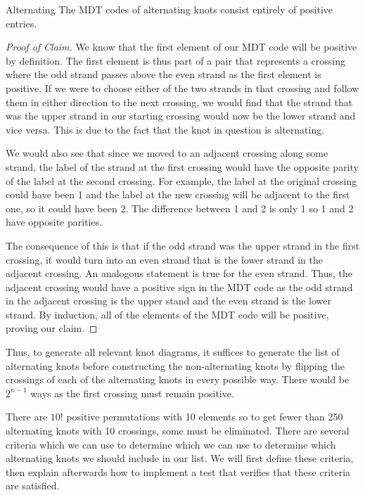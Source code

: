 \begin{paper}
\begin{paperclm}{Alternating}
{The MDT codes of alternating knots consist entirely of positive entries.}
\end{paperclm}
\begin{proof}[Proof of Claim]
We know that the first element of our MDT code will be positive by definition.
The first element is thus part of a pair that represents a crossing where the
odd strand passes above the even strand as the first element is positive.
If we were to choose either of the two strands in that crossing and follow them
in either direction to the next crossing, we would find that the strand that
was the upper strand in our starting crossing would now be the lower strand and
vice versa.
This is due to the fact that the knot in question is alternating.

We would also see that since we moved to an adjacent crossing along some strand,
the label of the strand at the first crossing would have the opposite parity of
the label at the second crossing.
For example, the label at the original crossing could have been 1 and the label
at the new crossing will be adjacent to the first one, so it could have been 2.
The difference between 1 and 2 is only 1 so 1 and 2 have opposite parities.

The consequence of this is that if the odd strand was the upper strand in the
first crossing, it would turn into an even strand that is the lower strand in
the adjacent crossing.
An analogous statement is true for the even strand.
Thus, the adjacent crossing would have a positive sign in the MDT code as the
odd strand in the adjacent crossing is the upper stand and the even strand is
the lower strand.
By induction, all of the elements of the MDT code will be positive, proving our
claim.
\end{proof}

Thus, to generate all relevant knot diagrams, it suffices to generate the list
of alternating knots before constructing the non-alternating knots by flipping
the crossings of each of the alternating knots in every possible way.
There would be $2^{n-1}$ ways as the first crossing must remain positive.

There are $10!$ positive permutations with 10 elements so to get fewer than 250
alternating knots with 10 crossings, some must be eliminated.
There are several criteria which we can use to determine which we can use to
determine which alternating knots we should include in our list.
We will first define these criteria, then explain afterwards how to implement a
test that verifies that these criteria are satisfied.


\end{paper}
